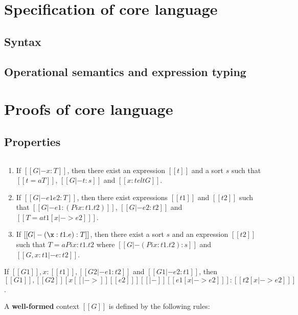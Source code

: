 \section{Specification of core language}

\subsection{Syntax}
\gram{\otte\ottinterrule
        \otts\ottinterrule
        \ottG\ottinterrule
        \ottv}

\subsection{Operational semantics and expression typing}
\ottdefnstep{}
\ottusedrule{\ottdruleSXXMu{}}
\ottdefnexpr{}
\ottusedrule{\ottdruleTXXMu{}}

\section{Proofs of core language}
\subsection{Properties}
\begin{lem}\label{lem:gen}
$\quad$
\begin{enumerate}
	\item If $[[G |- x:T]]$, then there exist an expression $[[t]]$ and a sort $s$ such that $[[t =a T]]$, $[[G |- t:s]]$ and $[[x:t elt G]]$.
	\item If $[[G |- e1 e2:T]]$, then there exist expressions $[[t1]]$ and $[[t2]]$ such that $[[G |- e1 : (Pi x:t1.t2)]]$, $[[G |- e2:t2]]$ and $[[T =a t1[x |-> e2] ]]$.
	\item If $[[G |- (\x:t1.e):T]]$, then there exist a sort $s$ and an expression $[[t2]]$ such that $T =a Pi x:t1.t2$ where $[[G |- (Pi x:t1.t2):s]]$ and $[[G,x:t1 |- e:t2]]$.
\end{enumerate}
\end{lem}

\begin{lem}
	If $[[G1]], x:[[t1]], [[G2 |- e1:t2]]$ and $[[G1 |- e2:t1]]$, then $[[G1]], [[G2]] [x [[|->]] [[e2]] ] [[|-]] [[e1[x |-> e2] ]] : [[t2[x |-> e2] ]]$.
\end{lem}

\begin{dfn}
	A \textbf{well-formed} context $[[G]]$ is defined by the following rules:
	
	\textnormal{\ottdefnctx{}}
\end{dfn}

